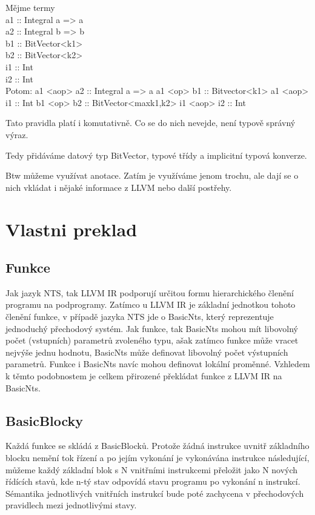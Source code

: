 \documentclass[10pt,a4paper,notitlepage]{report}
\begin{document}

Mějme termy\\
a1 :: Integral a => a\\
a2 :: Integral b => b\\
b1 :: BitVector<k1> \\
b2 :: BitVector<k2>\\
i1 :: Int\\
i2 :: Int\\

Potom:
a1 <aop> a2 :: Integral a => a
a1 <op>  b1 :: Bitvector<k1>
a1 <aop> i1 :: Int
b1 <op>  b2 :: BitVector<max{k1,k2}>
i1 <aop> i2 :: Int

Tato pravidla platí i komutativně. Co se do nich nevejde, není typově správný výraz.

Tedy přidáváme datový typ BitVector, typové třídy a implicitní typová konverze.

Btw můžeme využívat anotace. Zatím je využíváme jenom trochu, ale dají se o nich vkládat
i nějaké informace z LLVM nebo další postřehy.

\section{Vlastni preklad}

\subsection{Funkce}
Jak jazyk NTS, tak LLVM IR podporují určitou formu hierarchického členění programu na podprogramy. Zatímco u LLVM IR je základní jednotkou tohoto členění funkce, v případě jazyka NTS jde o BasicNts, který reprezentuje jednoduchý přechodový systém. Jak funkce, tak BasicNts mohou mít libovolný počet (vstupních) parametrů zvoleného typu, ašak zatímco funkce může vracet nejvýše jednu hodnotu, BasicNts může definovat libovolný počet výstupních parametrů. Funkce i BasicNts navíc mohou definovat lokální proměnné. Vzhledem k těmto podobnostem je celkem přirozené překládat funkce z LLVM IR na BasicNts.

\subsection{BasicBlocky}
Každá funkce se skládá z BasicBlocků. Protože žádná instrukce uvnitř základního blocku nemění tok řízení a po jejím vykonání je vykonávána instrukce následující, můžeme každý základní blok s N vnitřními instrukcemi přeložit jako N nových řídících stavů, kde n-tý stav odpovídá stavu programu po vykonání n instrukcí. Sémantika jednotlivých vnitřních instrukcí bude poté zachycena v přechodových pravidlech mezi jednotlivými stavy.
\end{document}
